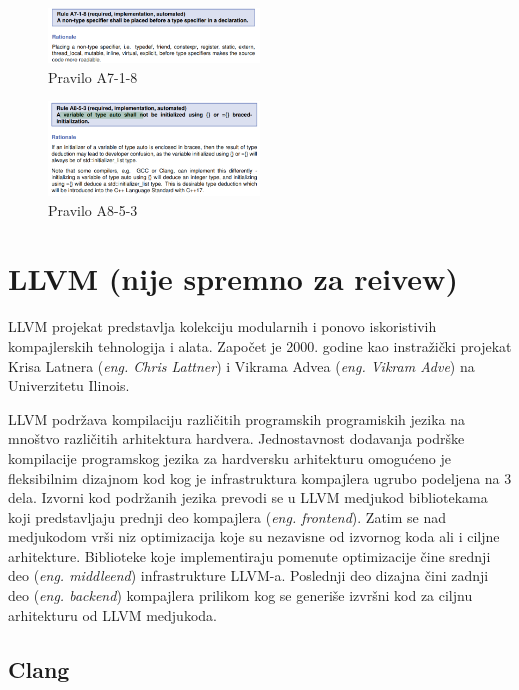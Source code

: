 \documentclass[12pt,oneside]{memoir}
\begin{document}
\begin{figure}[!ht]
  \centering
  \includegraphics[width=0.5\textwidth]{PraviloA718.png}
  \caption{Pravilo A7-1-8}
  \label{fig:grafikon}
\end{figure}

\begin{figure}[!ht]
  \centering
  \includegraphics[width=0.5\textwidth]{PraviloA853.png}
  \caption{Pravilo A8-5-3}
  \label{fig:grafikon}
\end{figure}

\chapter{LLVM (nije spremno za reivew)}
\label{chp:llvm}

LLVM projekat predstavlja kolekciju modularnih i ponovo iskoristivih kompajlerskih tehnologija i alata.
Započet je 2000. godine kao instražički projekat Krisa Latnera (\textit{eng. Chris Lattner}) i Vikrama Advea (\textit{eng. Vikram Adve}) na Univerzitetu Ilinois.

LLVM podržava kompilaciju različitih programskih programiskih jezika na mnoštvo različitih arhitektura hardvera. Jednostavnost dodavanja podrške kompilacije programskog jezika za hardversku arhitekturu omogućeno je fleksibilnim dizajnom kod kog je infrastruktura kompajlera ugrubo podeljena na 3 dela. Izvorni kod podržanih jezika prevodi se u LLVM medjukod bibliotekama koji predstavljaju prednji deo kompajlera (\textit{eng. frontend}). Zatim se nad medjukodom vrši niz optimizacija koje su nezavisne od izvornog koda ali i ciljne arhitekture. Biblioteke koje implementiraju pomenute optimizacije čine srednji deo (\textit{eng. middleend}) infrastrukture LLVM-a. Poslednji deo dizajna čini zadnji deo (\textit{eng. backend}) kompajlera prilikom kog se generiše izvršni kod za ciljnu arhitekturu od LLVM medjukoda.

\section{Clang}
\end{document}
